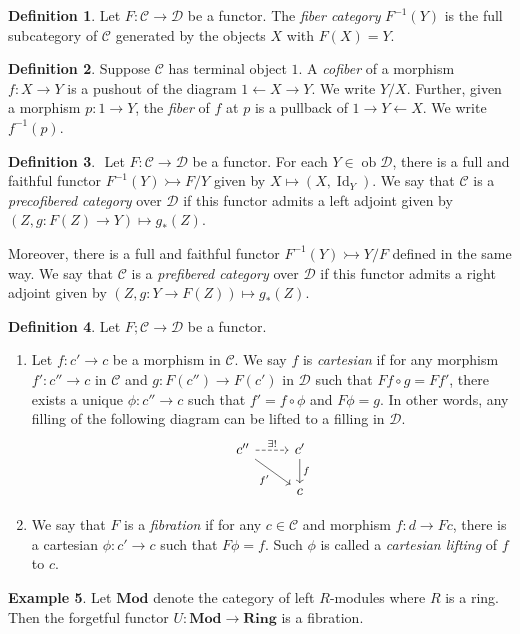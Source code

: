 \documentclass[10pt,letterpaper,cm]{nupset}
\theoremstyle{definition}
\newtheorem{definition}{Definition}
\newtheorem{exmp}[definition]{Example}
\theoremstyle{theorem}
\theoremstyle{remark}
\newcommand{\1}{\mathbf{1}}
\renewcommand{\c}{\mathscr{C}}
\renewcommand{\d}{\mathscr{D}}
\newcommand{\0}{\vec 0}
\DeclareMathOperator{\id}{Id}
\DeclareMathOperator{\ob}{ob}
\begin{document}
\begin{definition}
Let $F : \c \to \d$ be a functor. The \textit{fiber category} $F^{{-}1}(Y)$ is the full subcategory of $\c$ generated by the objects $X$ with $F(X) =Y$.
\end{definition}

\begin{definition}
Suppose $\c$ has terminal object $1$. A \textit{cofiber} of a morphism $f: X \to Y$ is a pushout of the diagram $1 \leftarrow X \rightarrow Y$. We write $Y/X$. Further, given a morphism $p: 1 \to Y$, the \textit{fiber} of $f$ at $p$ is a pullback of $1 \rightarrow Y \leftarrow X$. We write $f^{{-}1}(p)$.
\end{definition}

\begin{definition} $ $
Let $F : \c \to \d$ be a functor. For each $Y \in \ob \d$, there is a full and faithful functor $F^{{-}1}(Y)  \rightarrowtail F/Y$ given by $X \mapsto (X, \id_Y)$. We say that $\c$ is a \textit{precofibered category} over $\d$ if this functor admits a left adjoint given by $(Z, g: F(Z) \to Y) \mapsto g_{\ast}(Z)$.
\end{definition}

Moreover, there is a full and faithful functor $F^{{-}1}(Y) \rightarrowtail Y/F$ defined in the same way. We say that $\c$ is a \textit{prefibered category} over $\d$ if this functor admits a right adjoint given by $(Z, g: Y \to F(Z)) \mapsto g_{\ast}(Z)$.

\begin{definition}  Let $F ; \c \to \d$ be a functor.
\begin{enumerate}
\item Let $f: c' \to c$ be a morphism in $\c$. We say $f$ is \textit{cartesian} if for any morphism $f' : c'' \to c$ in $\c$ and $g : F(c'') \to F(c')$ in $\d$ such that $Ff \circ g = Ff'$, there exists a unique $\phi : c'' \to c$ such that $f' = f \circ \phi$ and $F\phi = g$. In other words, any filling of the following diagram can be lifted to a filling in $\d$.
\[ \begin{tikzcd}
c'' \arrow[r, dashed, "\exists!"] \arrow[swap, dr,  " f' "] & c' \arrow[d, "f"] \\%
 & c
\end{tikzcd}
\]
\item We say that $F$ is a \textit{fibration} if for any $c \in \c$ and morphism $f: d \to Fc$, there is a cartesian $\phi : c' \to c$ such that $F\phi =f$. Such $\phi$ is called a \textit{cartesian lifting} of $f$ to $c$.
\end{enumerate}
\end{definition}


\begin{exmp}
Let $\mathbf{Mod}$ denote the category of left $R$-modules where $R$ is a ring. Then the forgetful functor $U: \mathbf{Mod} \to \mathbf{Ring}$ is a fibration.
\end{exmp}
\end{document}
